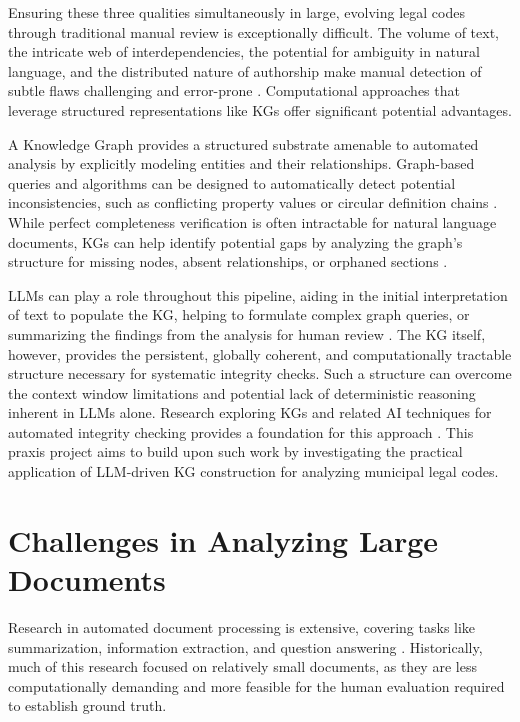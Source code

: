 Ensuring these three qualities simultaneously in large, evolving legal codes through traditional manual review is exceptionally difficult. The volume of text, the intricate web of interdependencies, the potential for ambiguity in natural language, and the distributed nature of authorship make manual detection of subtle flaws challenging and error-prone \parencite{RefWorks:RefID:68-beth2018bills}. Computational approaches that leverage structured representations like KGs offer significant potential advantages.

A Knowledge Graph provides a structured substrate amenable to automated analysis by explicitly modeling entities and their relationships. Graph-based queries and algorithms can be designed to automatically detect potential inconsistencies, such as conflicting property values or circular definition chains \parencite{RefWorks:RefID:77-tauqeer2022automated, RefWorks:RefID:24-brucker2019ontologies, RefWorks:RefID:19-schönberg2011verifying, RefWorks:RefID:23-weitl2006checking}. While perfect completeness verification is often intractable for natural language documents, KGs can help identify potential gaps by analyzing the graph's structure for missing nodes, absent relationships, or orphaned sections \parencite{RefWorks:RefID:151-rabbani2023extraction, RefWorks:RefID:152-rabbani2022shacl, RefWorks:RefID:153-omran2020shacl, RefWorks:RefID:154-knublauch2017shapes, RefWorks:RefID:29-umar2024advances}.

LLMs can play a role throughout this pipeline, aiding in the initial interpretation of text to populate the KG, helping to formulate complex graph queries, or summarizing the findings from the analysis for human review \parencite{RefWorks:RefID:107-benjira2025automated}. The KG itself, however, provides the persistent, globally coherent, and computationally tractable structure necessary for systematic integrity checks. Such a structure can overcome the context window limitations and potential lack of deterministic reasoning inherent in LLMs alone. Research exploring KGs and related AI techniques for automated integrity checking provides a foundation for this approach \parencite{RefWorks:RefID:29-umar2024advances, RefWorks:RefID:21-heitmeyer1996automated, RefWorks:RefID:77-tauqeer2022automated, RefWorks:RefID:76-dhani2021similar, RefWorks:RefID:11-aumiller2021structural}. This praxis project aims to build upon such work by investigating the practical application of LLM-driven KG construction for analyzing municipal legal codes.

\section{Challenges in Analyzing Large Documents} \label{sec:doc_processing}
Research in automated document processing is extensive, covering tasks like summarization, information extraction, and question answering \parencite{RefWorks:RefID:156-gambhir2017recent, RefWorks:RefID:121-zhong2024comprehensive, RefWorks:RefID:157-2017reading}. Historically, much of this research focused on relatively small documents, as they are less computationally demanding and more feasible for the human evaluation required to establish ground truth.

